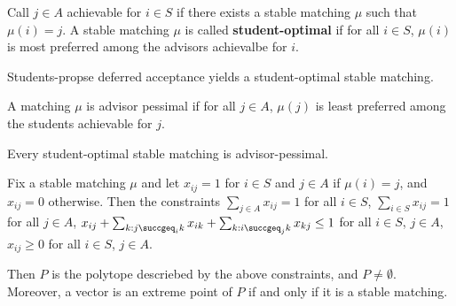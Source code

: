 \begin{thm}
  \label{sec:stable-matchings-3}
  Call $j \in A$ achievable for $i \in S$ if there exists a stable
  matching $\mu$ such that $\mu(i) = j$.  A stable matching $\mu$
  is called  \textbf{student-optimal} if for all $i \in S$, $\mu(i)$
  is most preferred among the advisors achievalbe for $i$.

  Students-propse deferred acceptance yields a student-optimal stable matching.
\end{thm}

\begin{thm}
  \label{sec:stable-matchings-4}
  A matching $\mu$ is advisor pessimal if for all $j \in A$, $\mu(j)$
  is least preferred among the students achievable for $j$.
  
  Every student-optimal stable matching is advisor-pessimal.
\end{thm}

\begin{thm}
  \label{sec:stable-matchings-5}
  Fix a stable matching $\mu$ and let $x_{ij} = 1$ for $i \in S$ and
  $j \in A$ if $\mu(i) = j$, and $x_{ij} = 0$ otherwise.  Then the
  constraints $\sum_{j \in A}^{} x_{ij} = 1$ for all $i \in S$,
  $\sum_{i \in S}^{} x_{ij} = 1$ for all $j \in A$, $x_{ij} + \sum_{k:
  j \succgeq_{i} k}^{} x_{ik} + \sum_{k: i \succgeq_{j} k}^{} x_{kj}
\leq 1$ for all $i \in S$, $j \in A$, $x_{ij} \geq 0$ for all $i \in
S$, $j \in A$.

Then $P$ is the polytope descriebed by the above constraints, and $P
\neq \emptyset$.  Moreover, a vector is an extreme point of $P$ if and
only if it is a stable matching.
\end{thm}







